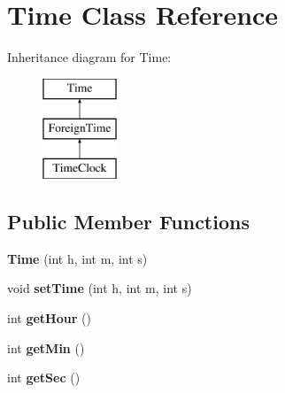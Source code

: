 \hypertarget{class_time}{\section{Time Class Reference}
\label{class_time}
}
Inheritance diagram for Time\+:\begin{figure}[H]
\begin{center}
\leavevmode
\includegraphics[height=3.000000cm]{class_time}
\end{center}
\end{figure}
\subsection*{Public Member Functions}
\begin{DoxyCompactItemize}
\item 
\hypertarget{class_time_a92491fd96ed1f4735d053080e3e47a32}{{\bfseries Time} (int h, int m, int s)}\label{class_time_a92491fd96ed1f4735d053080e3e47a32}

\item 
\hypertarget{class_time_ae05f94882a72debabb02e0889054d89a}{void {\bfseries set\+Time} (int h, int m, int s)}\label{class_time_ae05f94882a72debabb02e0889054d89a}

\item 
\hypertarget{class_time_ae0ce1e970c739d756282c95ebe458baf}{int {\bfseries get\+Hour} ()}\label{class_time_ae0ce1e970c739d756282c95ebe458baf}

\item 
\hypertarget{class_time_ac258de15a1a13d73c94ac06929899321}{int {\bfseries get\+Min} ()}\label{class_time_ac258de15a1a13d73c94ac06929899321}

\item 
\hypertarget{class_time_a07916f5becb53f92a29bcb02b11b7c3b}{int {\bfseries get\+Sec} ()}\label{class_time_a07916f5becb53f92a29bcb02b11b7c3b}

\end{DoxyCompactItemize}
